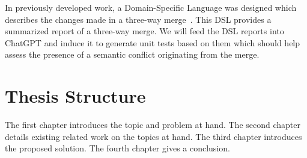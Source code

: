 In previously developed work, a Domain-Specific Language was designed which describes the changes made in a three-way merge~\citep{kn:nuno}. This DSL provides a summarized report of a three-way merge. We will feed the DSL reports into ChatGPT and induce it to generate unit tests based on them which should help assess the presence of a semantic conflict originating from the merge.






\section{Thesis Structure} \label{sec:struct}


The first chapter introduces the topic and problem at hand.
The second chapter details existing related work on the topics at hand.
The third chapter introduces the proposed solution.
The fourth chapter gives a conclusion.